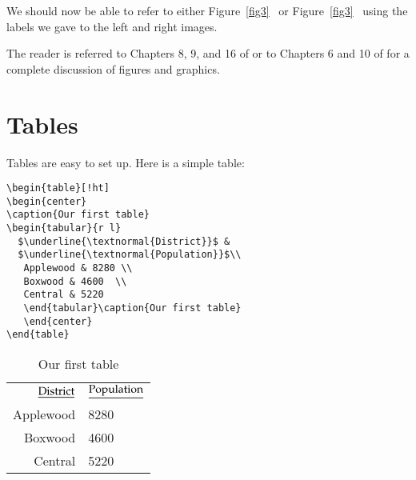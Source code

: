 We should now be able to refer to either Figure~\ref{fig3}~ or Figure~\ref{fig3}~ using the labels we gave to the left and right images.

The reader is referred to Chapters 8, 9, and 16 of \citet{kd03} or to Chapters 6 and 10 of \citet{mgbcr04} for a complete discussion of figures and graphics.

\section{Tables}

Tables are easy to set up. Here is a simple table:
\begin{singlespace}\small
\begin{verbatim}
\begin{table}[!ht]
\begin{center}
\caption{Our first table}
\begin{tabular}{r l}
  $\underline{\textnormal{District}}$ &  
  $\underline{\textnormal{Population}}$\\
   Applewood & 8280 \\
   Boxwood & 4600  \\
   Central & 5220
   \end{tabular}\caption{Our first table}
   \end{center}
\end{table}
\end{verbatim}
\end{singlespace}
\begin{table}[!ht]
\begin{center}
\caption{Our first table}
\begin{tabular}{r l}
  $\underline{\textnormal{District}}$ &
    $\underline{\textnormal{Population}}$\\
   Applewood & 8280 \\
   Boxwood & 4600  \\
   Central & 5220
   \end{tabular}
   \end{center}
\end{table}


